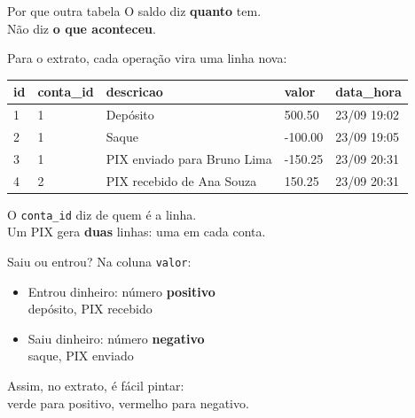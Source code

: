 \documentclass[aspectratio=169,11pt]{beamer}
\begin{document}
\begin{frame}{Por que outra tabela}
  O saldo diz \textbf{quanto} tem.\\
  Não diz \textbf{o que aconteceu}.

  \vspace{0.5em}
  Para o extrato, cada operação vira uma linha nova:

  \vspace{0.4em}
  \begin{center}
  \small
  \begin{tabular}{lllll}
    \toprule
    id & conta\_id & descricao & valor & data\_hora \\
    \midrule
    1 & 1 & Depósito & 500.50 & 23/09 19:02 \\
    2 & 1 & Saque & -100.00 & 23/09 19:05 \\
    3 & 1 & PIX enviado para Bruno Lima & -150.25 & 23/09 20:31 \\
    4 & 2 & PIX recebido de Ana Souza & 150.25 & 23/09 20:31 \\
    \bottomrule
  \end{tabular}
  \end{center}

  \vspace{0.4em}
  O \texttt{conta\_id} diz de quem é a linha.\\
  Um PIX gera \textbf{duas} linhas: uma em cada conta.
\end{frame}

\begin{frame}{Saiu ou entrou?}
  Na coluna \texttt{valor}:

  \vspace{0.4em}
  \begin{itemize}
    \item Entrou dinheiro: número \textbf{positivo}\\
          depósito, PIX recebido
    \item Saiu dinheiro: número \textbf{negativo}\\
          saque, PIX enviado
  \end{itemize}

  \vspace{0.5em}
  Assim, no extrato, é fácil pintar:\\
  verde para positivo, vermelho para negativo.
\end{frame}
\end{document}
